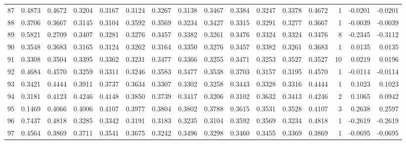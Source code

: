\begin{tabular}{lrrrrrrrrrrrrrrr}
87  &      0.4873 &  0.4672 &  0.3204 &  0.3167 &  0.3124 &  0.3267 &  0.3138 &  0.3467 &  0.3384 &  0.3247 &   0.3378 &     0.4672 &      1 &                   -0.0201 &                    -0.0201 \\
88  &      0.3706 &  0.3667 &  0.3145 &  0.3104 &  0.3592 &  0.3569 &  0.3234 &  0.3427 &  0.3315 &  0.3291 &   0.3277 &     0.3667 &      1 &                   -0.0039 &                    -0.0039 \\
89  &      0.5821 &  0.2709 &  0.3407 &  0.3281 &  0.3276 &  0.3457 &  0.3382 &  0.3261 &  0.3476 &  0.3324 &   0.3324 &     0.3476 &      8 &                   -0.2345 &                    -0.3112 \\
90  &      0.3548 &  0.3683 &  0.3165 &  0.3124 &  0.3262 &  0.3164 &  0.3350 &  0.3276 &  0.3457 &  0.3382 &   0.3261 &     0.3683 &      1 &                    0.0135 &                     0.0135 \\
91  &      0.3308 &  0.3504 &  0.3395 &  0.3362 &  0.3231 &  0.3477 &  0.3366 &  0.3255 &  0.3471 &  0.3253 &   0.3527 &     0.3527 &     10 &                    0.0219 &                     0.0196 \\
92  &      0.4684 &  0.4570 &  0.3259 &  0.3311 &  0.3246 &  0.3583 &  0.3477 &  0.3538 &  0.3703 &  0.3157 &   0.3195 &     0.4570 &      1 &                   -0.0114 &                    -0.0114 \\
93  &      0.3421 &  0.4444 &  0.3911 &  0.3737 &  0.3634 &  0.3307 &  0.3302 &  0.3258 &  0.3443 &  0.3328 &   0.3316 &     0.4444 &      1 &                    0.1023 &                     0.1023 \\
94  &      0.3181 &  0.4123 &  0.4246 &  0.4148 &  0.3850 &  0.3739 &  0.3417 &  0.3206 &  0.3102 &  0.3632 &   0.3413 &     0.4246 &      2 &                    0.1065 &                     0.0942 \\
95  &      0.1469 &  0.4066 &  0.4006 &  0.4107 &  0.3977 &  0.3804 &  0.3802 &  0.3788 &  0.3615 &  0.3531 &   0.3528 &     0.4107 &      3 &                    0.2638 &                     0.2597 \\
96  &      0.7437 &  0.4818 &  0.3285 &  0.3342 &  0.3191 &  0.3183 &  0.3235 &  0.3104 &  0.3592 &  0.3569 &   0.3234 &     0.4818 &      1 &                   -0.2619 &                    -0.2619 \\
97  &      0.4564 &  0.3869 &  0.3711 &  0.3541 &  0.3675 &  0.3242 &  0.3496 &  0.3298 &  0.3460 &  0.3455 &   0.3369 &     0.3869 &      1 &                   -0.0695 &                    -0.0695 \\

\end{tabular}

